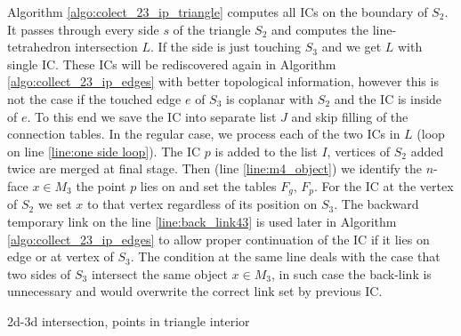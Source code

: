 \documentclass{elsarticle}
\newcommand{\nface}{$n$-face }
\begin{document}
Algorithm \ref{algo:colect_23_ip_triangle} computes all ICs on the boundary of $S_2$.  It passes through every side $s$ of the triangle $S_2$ 
and computes the line-tetrahedron intersection $L$.
If the side is just touching $S_3$ and we get $L$ with single IC. These ICs will be rediscovered again in Algorithm \ref{algo:collect_23_ip_edges} 
with better topological information, however this is not the case if the touched edge $e$ of $S_3$ is coplanar with $S_2$ and the IC is inside of $e$.
To this end we save the IC into separate list $J$ and skip filling of the connection tables.
In the regular case, we process each of the two ICs in $L$ (loop on line \ref{line:one side loop}). The IC $p$ is added to the list $I$,
vertices of $S_2$ added twice are merged at final stage. Then (line \ref{line:m4_object}) we identify the \nface $x\in M_3$ 
the point $p$ lies on and set the tables $F_g$, $F_p$. For the IC at the vertex of $S_2$ we set $x$ to that vertex regardless of its position on $S_3$.
The backward temporary link on the line \ref{line:back_link43} is used later in Algorithm \ref{algo:collect_23_ip_edges} to allow proper continuation 
of the IC if it lies on edge or at vertex of $S_3$. The condition at the same line deals with the case that two sides of $S_3$ intersect 
the same object $x\in M_3$, in such case the back-link is unnecessary and would overwrite the correct link set by previous IC.

\begin{algorithm}  
  \caption{2d-3d intersection, points in triangle interior}
  \label{algo:collect_23_ip_edges}
  
  \DontPrintSemicolon
  
    
\end{algorithm}
\end{document}
